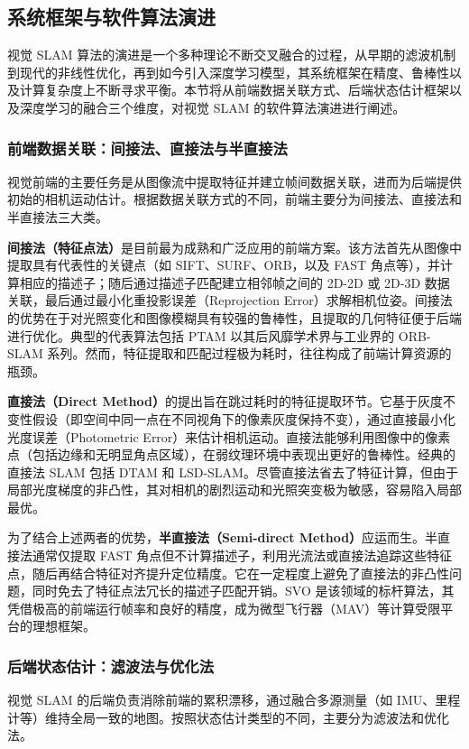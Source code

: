 \subsection{系统框架与软件算法演进}

视觉 SLAM 算法的演进是一个多种理论不断交叉融合的过程，从早期的滤波机制到现代的非线性优化，再到如今引入深度学习模型，其系统框架在精度、鲁棒性以及计算复杂度上不断寻求平衡。本节将从前端数据关联方式、后端状态估计框架以及深度学习的融合三个维度，对视觉 SLAM 的软件算法演进进行阐述。

\subsubsection{前端数据关联：间接法、直接法与半直接法}
视觉前端的主要任务是从图像流中提取特征并建立帧间数据关联，进而为后端提供初始的相机运动估计。根据数据关联方式的不同，前端主要分为间接法、直接法和半直接法三大类。

\textbf{间接法（特征点法）}是目前最为成熟和广泛应用的前端方案。该方法首先从图像中提取具有代表性的关键点（如 SIFT、SURF、ORB，以及 FAST 角点等），并计算相应的描述子；随后通过描述子匹配建立相邻帧之间的 2D-2D 或 2D-3D 数据关联，最后通过最小化重投影误差（Reprojection Error）求解相机位姿。间接法的优势在于对光照变化和图像模糊具有较强的鲁棒性，且提取的几何特征便于后端进行优化。典型的代表算法包括 PTAM 以其后风靡学术界与工业界的 ORB-SLAM 系列\cite{mur2015orb, mur2017orb, campos2021orb}。然而，特征提取和匹配过程极为耗时，往往构成了前端计算资源的瓶颈。

\textbf{直接法（Direct Method）}的提出旨在跳过耗时的特征提取环节。它基于灰度不变性假设（即空间中同一点在不同视角下的像素灰度保持不变），通过直接最小化光度误差（Photometric Error）来估计相机运动。直接法能够利用图像中的像素点（包括边缘和无明显角点区域），在弱纹理环境中表现出更好的鲁棒性。经典的直接法 SLAM 包括 DTAM\cite{newcombe2011dtam} 和 LSD-SLAM\cite{engel2014lsd}。尽管直接法省去了特征计算，但由于局部光度梯度的非凸性，其对相机的剧烈运动和光照突变极为敏感，容易陷入局部最优。

为了结合上述两者的优势，\textbf{半直接法（Semi-direct Method）}应运而生。半直接法通常仅提取 FAST 角点但不计算描述子，利用光流法或直接法追踪这些特征点，随后再结合特征对齐提升定位精度。它在一定程度上避免了直接法的非凸性问题，同时免去了特征点法冗长的描述子匹配开销。SVO\cite{forster2014svo} 是该领域的标杆算法，其凭借极高的前端运行帧率和良好的精度，成为微型飞行器（MAV）等计算受限平台的理想框架。

\subsubsection{后端状态估计：滤波法与优化法}
视觉 SLAM 的后端负责消除前端的累积漂移，通过融合多源测量（如 IMU、里程计等）维持全局一致的地图。按照状态估计类型的不同，主要分为滤波法和优化法。

